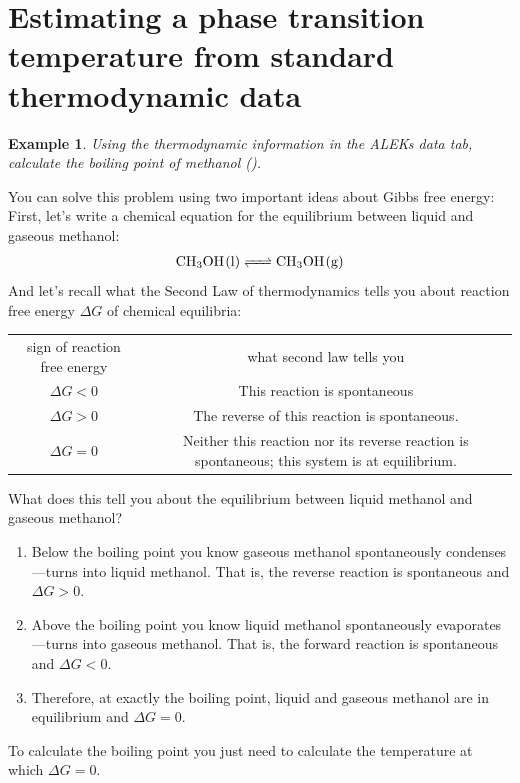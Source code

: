 \documentclass{article}  %
\newtheorem{exmp}{Example}
\begin{document}
\section*{Estimating a phase transition temperature from standard thermodynamic data}
\begin{exmp}
    Using the thermodynamic information in the ALEKs data tab, calculate the boiling point of methanol ().
\end{exmp}
You can solve this problem using two important ideas about Gibbs free energy: \\
First, let's write a chemical equation for the equilibrium between liquid and gaseous methanol: 
\begin{equation*}
    \begin{aligned}
        \ce{CH3OH_(l) <=> CH3OH_(g)}
    \end{aligned}
\end{equation*}
And let's recall what the Second Law of thermodynamics tells you about reaction free energy $\Delta G$ of chemical equilibria: 
\begin{center}
    \begin{tabular}{c c}
        sign of reaction free energy & what second law tells you \\
        $\Delta G < 0$ & This reaction is spontaneous \\
        $\Delta G > 0$ & The reverse of this reaction is spontaneous. \\
        $\Delta G = 0$ & Neither this reaction nor its reverse reaction is spontaneous; this system is at equilibrium.
    \end{tabular}
\end{center}
What does this tell you about the equilibrium between liquid methanol and gaseous methanol? 
\begin{enumerate}
    \item Below the boiling point you know gaseous methanol spontaneously condenses—turns into liquid methanol. That is, the reverse reaction is spontaneous and $\Delta G > 0$.
    \item Above the boiling point you know liquid methanol spontaneously evaporates—turns into gaseous methanol. That is, the forward reaction is spontaneous and $\Delta G < 0$.
    \item Therefore, at exactly the boiling point, liquid and gaseous methanol are in equilibrium and $\Delta G = 0$.
\end{enumerate}
To calculate the boiling point you just need to calculate the temperature at which $\Delta G = 0$. \\
\end{document}
